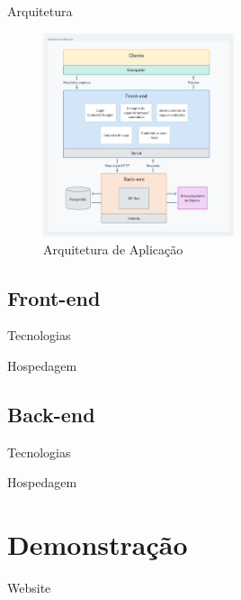 \documentclass[%
    english,
    brazil]{ifsp-spo-beamer}
\begin{document}
\begin{frame}{Arquitetura} 
	\begin{figure}
		\centering
		\caption{\label{fig-arq-app}Arquitetura de Aplicação}
		\includegraphics[width=0.5\textwidth]{../../imagens/arq-proj-arq-app2.png}
	\end{figure}
\end{frame}

\subsection{Front-end}
\begin{frame}{Tecnologias} 
	
\end{frame}

\begin{frame}{Hospedagem} 
	
\end{frame}

\subsection{Back-end}
\begin{frame}{Tecnologias} 
	
\end{frame}

\begin{frame}{Hospedagem} 
	
\end{frame}

\section{Demonstração}
\begin{frame}{Website} 
\end{frame}
\end{document}
